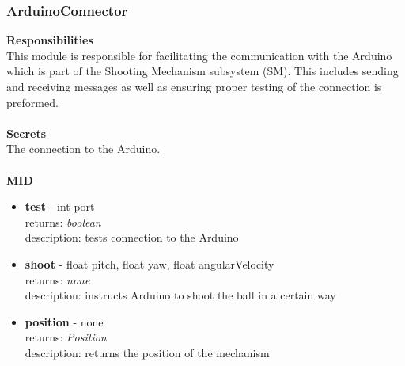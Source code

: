 \documentclass[11pt]{article}
\begin{document}
\subsubsection*{ArduinoConnector}
\textbf{Responsibilities} \\
This module is responsible for facilitating the communication with the Arduino which is part of the Shooting Mechanism subsystem (SM). This includes sending and receiving messages as well as ensuring proper testing of the connection is preformed. \\ \\
\textbf{Secrets} \\
The connection to the Arduino. \\ \\
\textbf{MID}
\begin{itemize}
\item \textbf{test} - int port \\ returns: \textit{boolean} \\ description: tests connection to the Arduino
\item \textbf{shoot} - float pitch, float yaw, float angularVelocity \\ returns: \textit{none} \\ description: instructs Arduino to shoot the ball in a certain way
\item \textbf{position} - none \\ returns: \textit{Position} \\ description: returns the position of the mechanism
\end{itemize}
\end{document}
